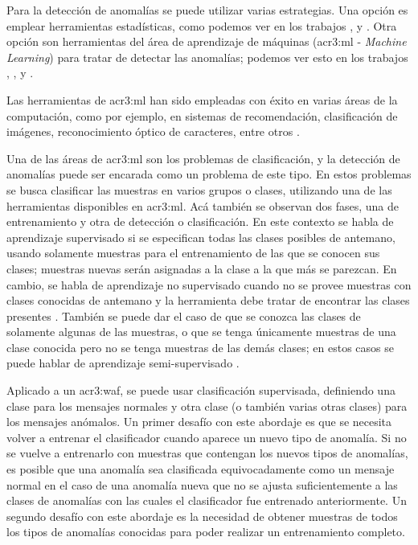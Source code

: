Para la detección de anomalías se puede utilizar varias estrategias.
Una opción es emplear herramientas estadísticas, como podemos ver en
los trabajos \citep{kruegel2003anomaly}, \citep{gimenez2015tfg} y
\citep{torranoGimenez2015study}.
Otra opción son herramientas del área de aprendizaje de máquinas
(\gls{acr3:ml} - \textit{Machine Learning}) para tratar de detectar
las anomalías; podemos ver esto en los trabajos \citep{sommer2010outside},
\citep{buczak2016survey}, \citep{parhizkar2015oc}
y \citep{torranoGimenez2015study}.

Las herramientas de \gls{acr3:ml} han sido empleadas con éxito en varias
áreas de la computación, como por ejemplo, en sistemas de recomendación,
clasificación de imágenes, reconocimiento óptico de caracteres, entre
otros \citep{torranoGimenez2015study}. %

Una de las áreas de \gls{acr3:ml} son los problemas de clasificación,
y la detección de anomalías puede ser encarada como un problema de este
tipo. En estos problemas se busca clasificar las muestras en varios grupos
o clases, utilizando una de las herramientas disponibles en \gls{acr3:ml}.
Acá también se observan dos fases, una de entrenamiento y otra de detección
o clasificación.
En este contexto se habla de aprendizaje supervisado si se especifican
todas las clases posibles de antemano, usando solamente muestras para el
entrenamiento de las que se conocen sus clases; muestras nuevas serán
asignadas a la clase a la que más se parezcan. En cambio, se habla de
aprendizaje no supervisado cuando no se provee muestras con clases conocidas
de antemano y la herramienta debe tratar de encontrar las clases presentes
\citep{torranoGimenez2015study}. %
También se puede dar el caso de que se conozca las clases de solamente
algunas de las muestras, o que se tenga únicamente muestras de una clase
conocida pero no se tenga muestras de las demás clases; en estos casos
se puede hablar de aprendizaje semi-supervisado
\citep{aggarwal2013outlier}. %

Aplicado a un \gls{acr3:waf}, se puede usar clasificación supervisada,
definiendo una clase para los mensajes normales y otra clase (o también
varias otras clases) para los mensajes anómalos.
Un primer desafío con este abordaje es que se necesita volver a entrenar
el clasificador cuando aparece un nuevo tipo de anomalía. Si no se vuelve
a entrenarlo con muestras que contengan los nuevos tipos de anomalías, es
posible que una anomalía sea clasificada equivocadamente como un mensaje
normal en el caso de una anomalía nueva que no se ajusta suficientemente
a las clases de anomalías con las cuales el clasificador fue entrenado
anteriormente.
Un segundo desafío con este abordaje es la necesidad de obtener muestras
de todos los tipos de anomalías conocidas para poder realizar un
entrenamiento completo.

